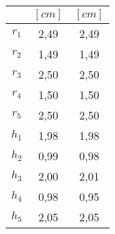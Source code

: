\begin{table}
 \centering
\begin{tabular}{c c c }
\multicolumn{1}{l}{} & \multicolumn{1}{c}{$[cm]$} & \multicolumn{1}{c}{$[cm]$} \\ 
\toprule
$r_1$& 2,49 & 2,49 \\
$r_2$& 1,49 & 1,49 \\ 
$r_3$& 2,50 & 2,50 \\
$r_4$& 1,50 & 1,50\\
$r_5$& 2,50 & 2,50 \\
$h_1$& 1,98 & 1,98 \\
$h_2$& 0,99 & 0,98 \\
$h_3$& 2,00 & 2,01 \\
$h_4$& 0,98 & 0,95\\
$h_5$& 2,05 & 2,05\\
\bottomrule
\end{tabular}
\end{table}
